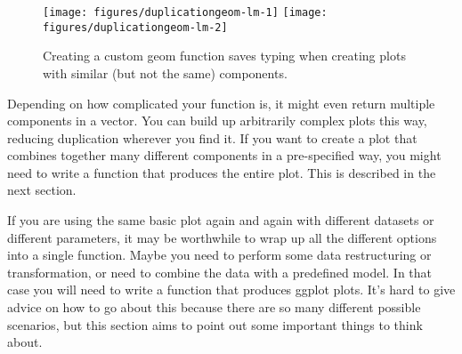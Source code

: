 \begin{figure}

{\centering \texttt{[image: figures/duplicationgeom-lm-1]} \texttt{[image: figures/duplicationgeom-lm-2]} 

}

\caption{Creating a custom geom function saves typing when creating plots with similar (but not the same) components.\label{fig:geom-lm}}
\end{figure}

Depending on how complicated your function is, it might even return
multiple components in a vector. You can build up arbitrarily complex
plots this way, reducing duplication wherever you find it. If you want
to create a plot that combines together many different components in a
pre-specified way, you might need to write a function that produces the
entire plot. This is described in the next section.


If you are using the same basic plot again and again with different
datasets or different parameters, it may be worthwhile to wrap up all
the different options into a single function. Maybe you need to perform
some data restructuring or transformation, or need to combine the data
with a predefined model. In that case you will need to write a function
that produces ggplot plots. It's hard to give advice on how to go about
this because there are so many different possible scenarios, but this
section aims to point out some important things to think about.
 

